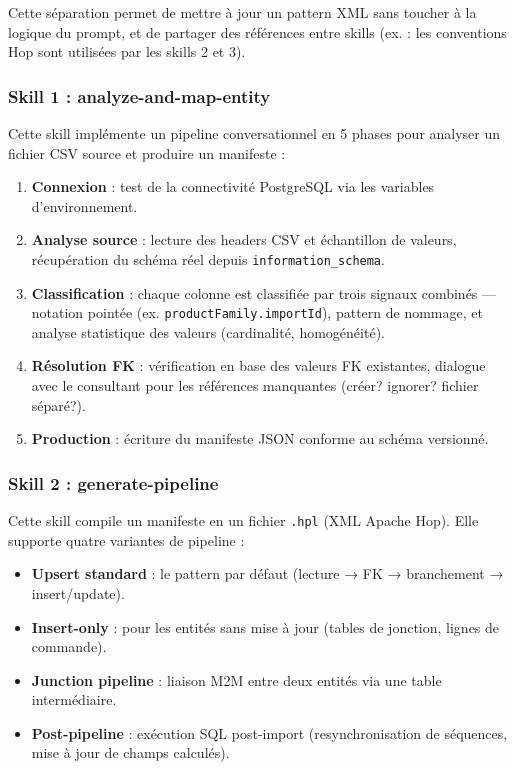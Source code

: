 \documentclass[a4paper,12pt]{article}
\begin{document}
Cette séparation permet de mettre à jour un pattern XML sans toucher à la logique du prompt, et de partager des références entre skills (ex. : les conventions Hop sont utilisées par les skills 2 et 3).

\subsubsection{Skill 1 : analyze-and-map-entity}

Cette skill implémente un pipeline conversationnel en 5 phases pour analyser un fichier CSV source et produire un manifeste :

\begin{enumerate}
  \item \textbf{Connexion} : test de la connectivité PostgreSQL via les variables d'environnement.
  \item \textbf{Analyse source} : lecture des headers CSV et échantillon de valeurs, récupération du schéma réel depuis \texttt{information\_schema}.
  \item \textbf{Classification} : chaque colonne est classifiée par trois signaux combinés — notation pointée (ex. \texttt{productFamily.importId}), pattern de nommage, et analyse statistique des valeurs (cardinalité, homogénéité).
  \item \textbf{Résolution FK} : vérification en base des valeurs FK existantes, dialogue avec le consultant pour les références manquantes (créer? ignorer? fichier séparé?).
  \item \textbf{Production} : écriture du manifeste JSON conforme au schéma versionné.
\end{enumerate}

\subsubsection{Skill 2 : generate-pipeline}

Cette skill compile un manifeste en un fichier \texttt{.hpl} (XML Apache Hop). Elle supporte quatre variantes de pipeline :

\begin{itemize}
  \item \textbf{Upsert standard} : le pattern par défaut (lecture → FK → branchement → insert/update).
  \item \textbf{Insert-only} : pour les entités sans mise à jour (tables de jonction, lignes de commande).
  \item \textbf{Junction pipeline} : liaison M2M entre deux entités via une table intermédiaire.
  \item \textbf{Post-pipeline} : exécution SQL post-import (resynchronisation de séquences, mise à jour de champs calculés).
\end{itemize}
\end{document}
